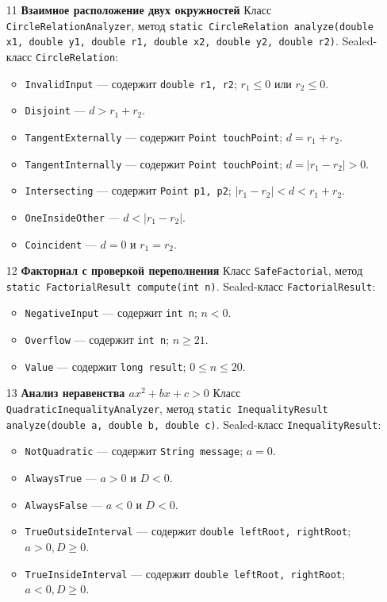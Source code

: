 \documentclass[12pt]{article}
\begin{document}
\begin{enumerate}
\item[11] \textbf{Взаимное расположение двух окружностей}
Класс \texttt{CircleRelationAnalyzer}, метод
\texttt{static CircleRelation analyze(double x1, double y1, double r1, double x2, double y2, double r2)}.
Sealed-класс \texttt{CircleRelation}:
\begin{itemize}
\item \texttt{InvalidInput} — содержит \texttt{double r1, r2}; \(r_1 \leq 0\) или \(r_2 \leq 0\).
\item \texttt{Disjoint} — \(d > r_1 + r_2\).
\item \texttt{TangentExternally} — содержит \texttt{Point touchPoint}; \(d = r_1 + r_2\).
\item \texttt{TangentInternally} — содержит \texttt{Point touchPoint}; \(d = |r_1 - r_2| > 0\).
\item \texttt{Intersecting} — содержит \texttt{Point p1, p2}; \(|r_1 - r_2| < d < r_1 + r_2\).
\item \texttt{OneInsideOther} — \(d < |r_1 - r_2|\).
\item \texttt{Coincident} — \(d = 0\) и \(r_1 = r_2\).
\end{itemize}

\item[12] \textbf{Факториал с проверкой переполнения}
Класс \texttt{SafeFactorial}, метод
\texttt{static FactorialResult compute(int n)}.
Sealed-класс \texttt{FactorialResult}:
\begin{itemize}
\item \texttt{NegativeInput} — содержит \texttt{int n}; \(n < 0\).
\item \texttt{Overflow} — содержит \texttt{int n}; \(n \geq 21\).
\item \texttt{Value} — содержит \texttt{long result}; \(0 \leq n \leq 20\).
\end{itemize}

\item[13] \textbf{Анализ неравенства \(ax^2 + bx + c > 0\)}
Класс \texttt{QuadraticInequalityAnalyzer}, метод
\texttt{static InequalityResult analyze(double a, double b, double c)}.
Sealed-класс \texttt{InequalityResult}:
\begin{itemize}
\item \texttt{NotQuadratic} — содержит \texttt{String message}; \(a = 0\).
\item \texttt{AlwaysTrue} — \(a > 0\) и \(D < 0\).
\item \texttt{AlwaysFalse} — \(a < 0\) и \(D < 0\).
\item \texttt{TrueOutsideInterval} — содержит \texttt{double leftRoot, rightRoot}; \(a > 0, D \geq 0\).
\item \texttt{TrueInsideInterval} — содержит \texttt{double leftRoot, rightRoot}; \(a < 0, D \geq 0\).
\end{itemize}


\end{enumerate}
\end{document}
